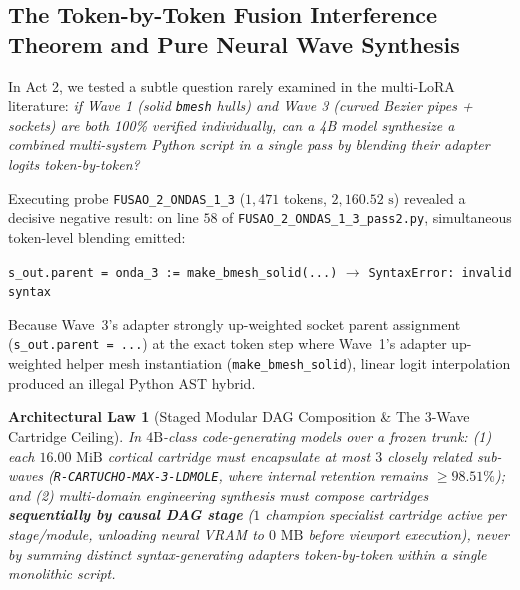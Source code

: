 \documentclass[10pt,a4paper]{article}
\newtheorem{theorem}{Architectural Law}
\begin{document}
\subsection{The Token-by-Token Fusion Interference Theorem and Pure Neural Wave Synthesis}

In Act 2, we tested a subtle question rarely examined in the multi-LoRA literature: \textit{if Wave 1 (solid \texttt{bmesh} hulls) and Wave 3 (curved Bezier pipes + sockets) are both 100\% verified individually, can a 4B model synthesize a combined multi-system Python script in a single pass by blending their adapter logits token-by-token?}

Executing probe \texttt{FUSAO\_\allowbreak{}2\_\allowbreak{}ONDAS\_\allowbreak{}1\_\allowbreak{}3} ($1,471$ tokens, $2,160.52\text{ s}$) revealed a decisive negative result: on line $58$ of \texttt{FUSAO\_\allowbreak{}2\_\allowbreak{}ONDAS\_\allowbreak{}1\_\allowbreak{}3\_\allowbreak{}pass2.py}, simultaneous token-level blending emitted:
\begin{center}
  \texttt{s\_\allowbreak{}out.parent = onda\_\allowbreak{}3 := make\_\allowbreak{}bmesh\_\allowbreak{}solid(...)} \quad $\longrightarrow$ \quad \texttt{SyntaxError: invalid syntax}
\end{center}
Because Wave~3's adapter strongly up-weighted socket parent assignment (\texttt{s\_\allowbreak{}out.parent = ...}) at the exact token step where Wave~1's adapter up-weighted helper mesh instantiation (\texttt{make\_\allowbreak{}bmesh\_\allowbreak{}solid}), linear logit interpolation produced an illegal Python AST hybrid.

\begin{theorem}[Staged Modular DAG Composition \& The 3-Wave Cartridge Ceiling]
In $4\text{B}$-class code-generating models over a frozen trunk: (1) each $16.00\text{ MiB}$ cortical cartridge must encapsulate at most $3$ closely related sub-waves (\texttt{R-CARTUCHO-MAX-3-LDMOLE}, where internal retention remains $\ge 98.51\%$); and (2) multi-domain engineering synthesis must compose cartridges \textbf{sequentially by causal DAG stage} ($1$ champion specialist cartridge active per stage/module, unloading neural VRAM to $0\text{ MB}$ before viewport execution), never by summing distinct syntax-generating adapters token-by-token within a single monolithic script.
\end{theorem}
\end{document}
